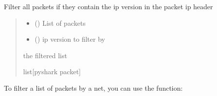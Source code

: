 \documentclass[letterpaper,10pt,english,openany,oneside]{sphinxmanual}
\begin{document}
\begin{fulllineitems}
\label{\detokenize{index:pktsniffer.filter_by_ip}}
\pysigstartsignatures
\pysiglinewithargsret
{}
{\sphinxparamcomma {}}
{}
\pysigstopsignatures
\sphinxAtStartPar
Filter all packets if they contain the ip version in the
packet ip header
\begin{quote}\begin{description}
\begin{itemize}
\item {} 
\sphinxAtStartPar
{} (\sphinxstyleliteralemphasis{\sphinxupquote{{[}}}\sphinxstyleliteralemphasis{\sphinxupquote{{]}}}) \textendash{} List of packets

\item {} 
\sphinxAtStartPar
{} () \textendash{} ip version to filter by

\end{itemize}

\sphinxAtStartPar
the filtered list

\sphinxAtStartPar
list{[}pyshark packet{]}

\end{description}\end{quote}

\end{fulllineitems}


\sphinxAtStartPar
To filter a list of packets by a net, you can
use the  function:
\end{document}
